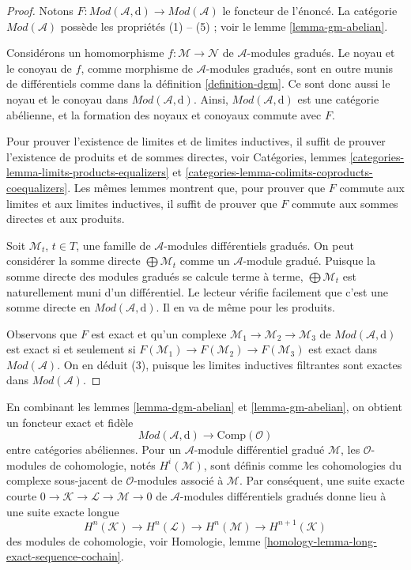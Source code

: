 \begin{proof}
Notons
$F : \textit{Mod}(\mathcal{A}, \text{d}) \to \textit{Mod}(\mathcal{A})$
le foncteur de l'énoncé. La catégorie
$\textit{Mod}(\mathcal{A})$ possède les propriétés (1) -- (5) ; voir le lemme
\ref{lemma-gm-abelian}.

\medskip\noindent
Considérons un homomorphisme $f : \mathcal{M} \to \mathcal{N}$
de $\mathcal{A}$-modules gradués. Le noyau et
le conoyau de $f$, comme morphisme de $\mathcal{A}$-modules
gradués, sont en outre munis de différentiels comme dans
la définition \ref{definition-dgm}. Ce sont donc aussi le
noyau et le conoyau dans $\textit{Mod}(\mathcal{A}, \text{d})$. Ainsi,
$\textit{Mod}(\mathcal{A}, \text{d})$ est une catégorie abélienne, et
la formation des noyaux et conoyaux commute avec $F$.

\medskip\noindent
Pour prouver l'existence de limites et de limites inductives, il suffit de
prouver l'existence de produits et de sommes directes, voir
Catégories, lemmes \ref{categories-lemma-limits-products-equalizers} et
\ref{categories-lemma-colimits-coproducts-coequalizers}. Les mêmes lemmes
montrent que, pour prouver
que $F$ commute aux limites et aux limites inductives, il suffit de
prouver que $F$ commute aux sommes directes et aux produits.

\medskip\noindent
Soit $\mathcal{M}_t$, $t \in T$, une famille de
$\mathcal{A}$-modules différentiels gradués. On peut considérer la somme directe
$\bigoplus \mathcal{M}_t$ comme un $\mathcal{A}$-module gradué.
Puisque la somme directe des modules gradués se calcule terme à terme,
$\bigoplus \mathcal{M}_t$ est naturellement muni d'un différentiel. Le lecteur
vérifie facilement que c'est une somme directe en
$\textit{Mod}(\mathcal{A}, \text{d})$. Il en va de même pour les produits.

\medskip\noindent
Observons que $F$ est exact et qu'un complexe
$\mathcal{M}_1 \to \mathcal{M}_2 \to \mathcal{M}_3$ de
$\textit{Mod}(\mathcal{A}, \text{d})$ est exact si et seulement si
$F(\mathcal{M}_1) \to F(\mathcal{M}_2) \to F(\mathcal{M}_3)$ est
exact dans $\textit{Mod}(\mathcal{A})$. On en déduit (3), puisque les
limites inductives filtrantes sont exactes dans
$\textit{Mod}(\mathcal{A})$.
\end{proof}

\noindent
En combinant les lemmes \ref{lemma-dgm-abelian} et \ref{lemma-gm-abelian},
on obtient un foncteur exact et fidèle
$$
\textit{Mod}(\mathcal{A}, \text{d}) \longrightarrow \text{Comp}(\mathcal{O})
$$ entre catégories
abéliennes. Pour un $\mathcal{A}$-module différentiel gradué
$\mathcal{M}$, les $\mathcal{O}$-modules de cohomologie, notés $H^i(\mathcal{M})$, sont
définis comme les cohomologies du complexe sous-jacent
de $\mathcal{O}$-modules associé à $\mathcal{M}$. Par
conséquent, une suite exacte courte
$0 \to \mathcal{K} \to \mathcal{L} \to \mathcal{M} \to 0$ de
$\mathcal{A}$-modules différentiels gradués
donne lieu à une suite exacte longue
\begin{equation}
\label{equation-les}
H^n(\mathcal{K}) \to H^n(\mathcal{L}) \to H^n(\mathcal{M}) \to
H^{n + 1}(\mathcal{K})
\end{equation} des
modules de cohomologie, voir
Homologie, lemme \ref{homology-lemma-long-exact-sequence-cochain}.

